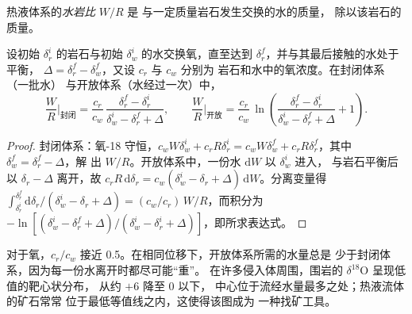 \begin{definition}[水岩比]\label{def:b3:water-rock-interaction:water-rock-ratio}
热液体系的\emph{水岩比} $W/R$ 是
与一定质量岩石发生交换的水的质量，
除以该岩石的质量。
\end{definition}

\begin{proposition}[由氧同位素求水岩比]\label{prop:b3:water-rock-interaction:wr}
设初始 $\delta_r^i$ 的岩石与初始
$\delta_w^i$ 的水交换氧，直至达到 $\delta_r^f$，并与其最后接触的水处于平衡，
$\Delta = \delta_r^f - \delta_w^f$，又设 $c_r$ 与 $c_w$ 分别为
岩石和水中的氧浓度。在封闭体系（一批水）
与开放体系（水经过一次）中，
\[
\frac WR\Big|_{\text{封闭}} = \frac{c_r}{c_w}\,
\frac{\delta_r^f - \delta_r^i}{\delta_w^i - \delta_r^f + \Delta},
\qquad
\frac WR\Big|_{\text{开放}} = \frac{c_r}{c_w}\,
\ln\!\left(\frac{\delta_r^f - \delta_r^i}{\delta_w^i - \delta_r^f + \Delta} + 1\right).
\]
\end{proposition}

\begin{proof}
封闭体系：氧-18 守恒，$c_wW\delta_w^i + c_rR\delta_r^i = c_wW
\delta_w^f + c_rR\delta_r^f$，其中 $\delta_w^f = \delta_r^f - \Delta$，解
出 $W/R$。开放体系中，一份水 $\mathrm dW$ 以 $\delta_w^i$ 进入，
与岩石平衡后以 $\delta_r - \Delta$ 离开，故 $c_rR\,\mathrm d\delta_r
= c_w(\delta_w^i - \delta_r + \Delta)\,\mathrm dW$。分离变量得
$\int_{\delta_r^i}^{\delta_r^f}\mathrm d\delta_r/(\delta_w^i - \delta_r +
\Delta) = (c_w/c_r)\,W/R$，而积分为 $-\ln[(\delta_w^i - \delta_r^f
+ \Delta)/(\delta_w^i - \delta_r^i + \Delta)]$，即所求表达式。
\end{proof}

对于氧，$c_r/c_w$ 接近 0.5。在相同位移下，开放体系所需的水量总是
少于封闭体系，因为每一份水离开时都尽可能“重”。
在许多侵入体周围，围岩的 $\delta^{18}\mathrm O$ 呈现低值的靶心状分布，
从约 $+6$ 降至 0 以下，
中心位于流经水量最多之处；热液流体的矿石常常
位于最低等值线之内，这使得该图成为
一种找矿工具。

